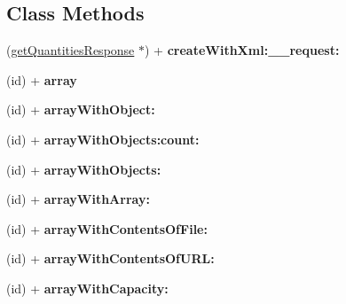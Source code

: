 \subsection*{Class Methods}
\begin{DoxyCompactItemize}
\item 
\hypertarget{interfaceget_quantities_response_ab276349cc2135cc2072581a121337f6d}{}(\hyperlink{interfaceget_quantities_response}{get\+Quantities\+Response} $\ast$) + {\bfseries create\+With\+Xml\+:\+\_\+\+\_\+request\+:}\label{interfaceget_quantities_response_ab276349cc2135cc2072581a121337f6d}

\item 
\hypertarget{interfaceget_quantities_response_ac513132b6a54551c5df06d75bc476c18}{}(id) + {\bfseries array}\label{interfaceget_quantities_response_ac513132b6a54551c5df06d75bc476c18}

\item 
\hypertarget{interfaceget_quantities_response_a1e310c64431ee56f2e32a14f4315c2f2}{}(id) + {\bfseries array\+With\+Object\+:}\label{interfaceget_quantities_response_a1e310c64431ee56f2e32a14f4315c2f2}

\item 
\hypertarget{interfaceget_quantities_response_aa43f31c10533e0fc69a2a8e19b0ea7d4}{}(id) + {\bfseries array\+With\+Objects\+:count\+:}\label{interfaceget_quantities_response_aa43f31c10533e0fc69a2a8e19b0ea7d4}

\item 
\hypertarget{interfaceget_quantities_response_abef397aafd01d15f7469d0f1127fb71c}{}(id) + {\bfseries array\+With\+Objects\+:}\label{interfaceget_quantities_response_abef397aafd01d15f7469d0f1127fb71c}

\item 
\hypertarget{interfaceget_quantities_response_ad01069a2c8e5a9ae2ef2ef38a23e1994}{}(id) + {\bfseries array\+With\+Array\+:}\label{interfaceget_quantities_response_ad01069a2c8e5a9ae2ef2ef38a23e1994}

\item 
\hypertarget{interfaceget_quantities_response_ada3e9a57213eaf25518337568c945cfa}{}(id) + {\bfseries array\+With\+Contents\+Of\+File\+:}\label{interfaceget_quantities_response_ada3e9a57213eaf25518337568c945cfa}

\item 
\hypertarget{interfaceget_quantities_response_a8c1ec180f58616a389ef8fd574418994}{}(id) + {\bfseries array\+With\+Contents\+Of\+U\+R\+L\+:}\label{interfaceget_quantities_response_a8c1ec180f58616a389ef8fd574418994}

\item 
\hypertarget{interfaceget_quantities_response_aebdf8c3c6f04127d59f96ebb55dd2dc5}{}(id) + {\bfseries array\+With\+Capacity\+:}\label{interfaceget_quantities_response_aebdf8c3c6f04127d59f96ebb55dd2dc5}

\end{DoxyCompactItemize}
